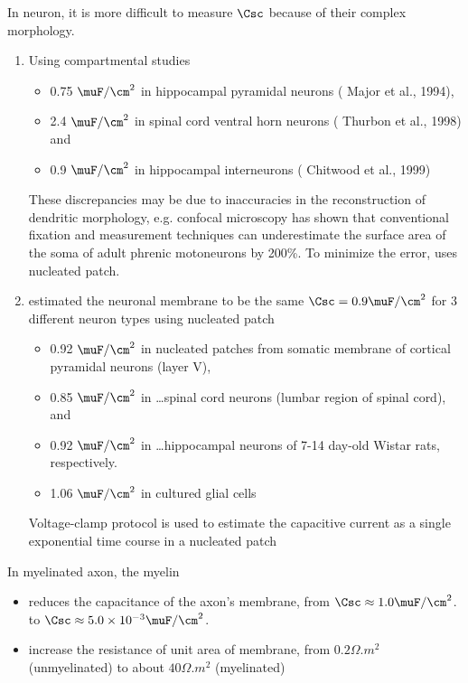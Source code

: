 In neuron, it is more difficult to measure $\Csc$ because of their
complex morphology. 
\begin{enumerate}
  \item Using compartmental studies 
  \begin{itemize}
  \item 0.75 $\muF/\cm^2$ in hippocampal pyramidal neurons ( Major et al.,
  1994), 
  \item 2.4 $\muF/\cm^2$ in spinal cord ventral horn neurons ( Thurbon et al.,
  1998) and 
  \item 0.9 $\muF/\cm^2$ in hippocampal interneurons ( Chitwood et al., 1999)
  \end{itemize}

These discrepancies may be due to inaccuracies in the reconstruction of
dendritic morphology, e.g.
confocal microscopy has shown that conventional fixation and measurement
techniques can underestimate the surface area of the soma of adult phrenic
motoneurons by 200\%.
To minimize the error, \citep{gentet2008} uses nucleated patch.
    
  \item \citep{gentet2008} estimated the neuronal membrane to be the same 
  $\Csc = 0.9 \muF/\cm^2$ for 3 different neuron types using nucleated patch
  \begin{itemize}
  \item 0.92 $\muF/\cm^2$ in nucleated patches from somatic membrane of cortical
  pyramidal neurons (layer V), 
  \item 0.85 $\muF/\cm^2$ in \ldots spinal cord neurons (lumbar region of spinal
  cord), and 
  \item 0.92 $\muF/\cm^2$ in \ldots hippocampal neurons of 7-14 day-old Wistar
  rats, respectively.
  \item 1.06 $\muF/\cm^2$ in cultured glial cells
  \end{itemize}
  Voltage-clamp protocol is used to estimate the capacitive current as a
  single exponential time course in a nucleated patch
  
\end{enumerate}

\begin{mdframed}
In myelinated axon, the myelin 
\begin{itemize} 
  \item  reduces the capacitance of the axon's membrane,
from $\Csc \approx 1.0 \muF/\cm^2$. to $\Csc \approx 5.0 \times
10^{-3} \muF/\cm^2$.

  \item increase the resistance of unit area of membrane, from $0.2 \Omega.m^2$
  (unmyelinated) to about $40 \Omega.m^2$ (myelinated)
\end{itemize}
\end{mdframed}

